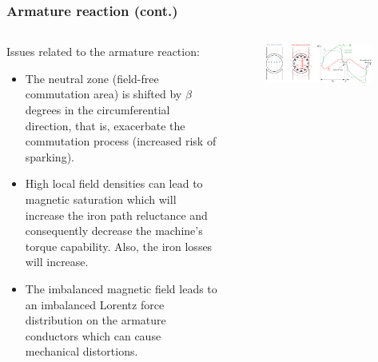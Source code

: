 \begin{frame}
	\frametitle{Armature reaction (cont.)}
	\begin{columns}
		\begin{column}{0.55\textwidth}
	Issues related to the armature reaction:
	\begin{itemize}
		\item The neutral zone (field-free commutation area) is shifted by $\beta$ degrees in the circumferential direction, that is, exacerbate the commutation process (increased risk of sparking).
		\item<2-> High local field densities can lead to magnetic saturation which will increase the iron path reluctance and consequently decrease the machine's torque capability. Also, the iron losses will increase. 
		\item<3-> The imbalanced magnetic field leads to an imbalanced Lorentz force distribution on the armature conductors which can cause mechanical distortions. 
	\end{itemize}
\end{column}
\hfill
\begin{column}{0.45\textwidth}
	\begin{figure}
		\centering
		\includegraphics[trim={7.2cm 0 0 0}, clip, width=0.95\textwidth]{fig/lec03/Armature_reaction.pdf}
	\end{figure}
\end{column}
\end{columns}
\end{frame}


